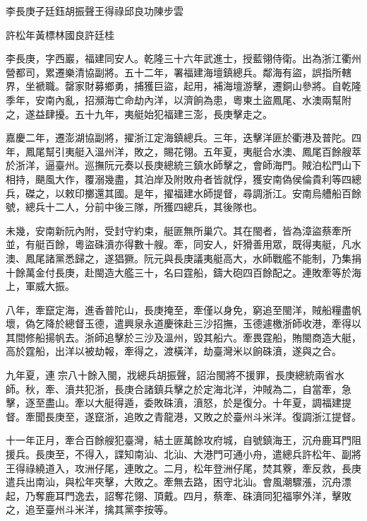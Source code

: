 
\begin{pinyinscope}
李長庚子廷鈺胡振聲王得祿邱良功陳步雲

許松年黃標林國良許廷桂

李長庚，字西巖，福建同安人。乾隆三十六年武進士，授藍翎侍衛。出為浙江衢州營都司，累遷樂清協副將。五十二年，署福建海壇鎮總兵。鄰海有盜，誤指所轄界，坐褫職。罄家財募鄉勇，捕獲巨盜，起用，補海壇游擊，遷銅山參將。自乾隆季年，安南內亂，招瀕海亡命劫內洋，以濟餉為患，粵東土盜鳳尾、水澳兩幫附之，遂益肆擾。五十九年，夷艇始犯福建三澎，長庚擊走之。

嘉慶二年，遷澎湖協副將，擢浙江定海鎮總兵。三年，迭擊洋匪於衢港及普陀。四年，鳳尾幫引夷艇入溫州洋，敗之，賜花翎。五年夏，夷艇合水澳、鳳尾百餘艘萃於浙洋，逼臺州。巡撫阮元奏以長庚總統三鎮水師擊之，會師海門。賊泊松門山下相持，颶風大作，覆溺幾盡，其泊岸及附敗舟者皆就俘，獲安南偽侯倫貴利等四總兵，磔之，以敕印擲還其國。是年，擢福建水師提督，尋調浙江。安南烏艚船百餘號，總兵十二人，分前中後三隊，所獲四總兵，其後隊也。

未幾，安南新阮內附，受封守約束，艇匪無所巢穴。其在閩者，皆為漳盜蔡牽所並，有艇百餘，粵盜硃濆亦得數十艘。牽，同安人，奸猾善用眾，既得夷艇，凡水澳、鳳尾諸黨悉歸之，遂猖獗。阮元與長庚議夷艇高大，水師戰艦不能制，乃集捐十餘萬金付長庚，赴閩造大艦三十，名曰霆船，鑄大砲四百餘配之。連敗牽等於海上，軍威大振。

八年，牽竄定海，進香普陀山，長庚掩至，牽僅以身免，窮追至閩洋，賊船糧盡帆壞，偽乞降於總督玉德，遣興泉永道慶徠赴三沙招撫，玉德遽檄浙師收港，牽得以其間修船揚帆去。浙師追擊於三沙及溫州，毀其船六。牽畏霆船，賄閩商造大艇，高於霆船，出洋以被劫報，牽得之，渡橫洋，劫臺灣米以餉硃濆，遂與之合。

九年夏，連宗八十餘入閩，戕總兵胡振聲，詔治閩將不援罪，長庚總統兩省水師。秋，牽、濆共犯浙，長庚合諸鎮兵擊之於定海北洋，沖賊為二，自當牽，急擊，逐至盡山。牽以大艇得遁，委敗硃濆，濆怒，於是復分。十年夏，調福建提督。牽聞長庚至，遂竄浙，追敗之青龍港，又敗之於臺州斗米洋。復調浙江提督。

十一年正月，牽合百餘艘犯臺灣，結土匪萬餘攻府城，自號鎮海王，沉舟鹿耳門阻援兵。長庚至，不得入，諜知南汕、北汕、大港門可通小舟，遣總兵許松年、副將王得祿繞道入，攻洲仔尾，連敗之。二月，松年登洲仔尾，焚其藔，牽反救，長庚遣兵出南汕，與松年夾擊，大敗之。牽無去路，困守北汕。會風潮驟漲，沉舟漂起，乃奪鹿耳門逸去，詔奪花翎、頂戴。四月，蔡牽、硃濆同犯福寧外洋，擊敗之，追至臺州斗米洋，擒其黨李按等。


\end{pinyinscope}
